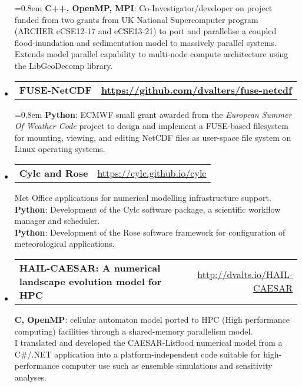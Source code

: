 \documentclass[10.5pt,a4]{article}
\makeatletter
\newcommand{\headerrow}[2]
{\begin{tabular*}{\linewidth}{l@{\extracolsep{\fill}}r}
	#1 &
	#2 \\
\end{tabular*}}
\newcommand{\CPP}
{C\nolinebreak[4]\hspace{-.05em}\raisebox{.22ex}{\footnotesize\bf ++}}
\makeatother
\begin{document}
\begin{itemize}
		\parskip=0.8em
		\textbf{C++, OpenMP, MPI}: Co-Investigator/developer on project funded from two grants from UK National Supercomputer program (ARCHER eCSE12-17 and eCSE13-21) to port and parallelise a coupled flood-inundation and sedimentation model to massively parallel systems. Extends model parallel capability to multi-node compute architecture using the LibGeoDecomp library. 

\item
\headerrow
		{\textbf{FUSE-NetCDF}}
		{\textbf{\url{https://github.com/dvalters/fuse-netcdf}}}

		\parskip=0.8em
		\textbf{Python}: ECMWF small grant awarded from the \textit{European Summer Of Weather Code} project to design and implement a FUSE-based filesystem for mounting, viewing, and editing NetCDF files as user-space file system on Linux operating systems.

%

	\item
	\headerrow
		{\textbf{Cylc and Rose}}
		{\url{https://cylc.github.io/cylc}}

		Met Office applications for numerical modelling infrastructure support. \\
		\textbf{Python}: Development of the Cylc software package, a scientific workflow manager and scheduler. \\ 
		\textbf{Python}: Development of the Rose software framework for configuration of meteorological applications. 

	\item
	\headerrow
		{\textbf{HAIL-CAESAR: A numerical landscape evolution model for HPC}}
		{\url{http://dvalts.io/HAIL-CAESAR}}

		\textbf{{\CPP}, OpenMP}: cellular automaton model ported to HPC (High performance computing) facilities through a shared-memory parallelism model. \\
		I translated and developed the CAESAR-Lisflood numerical model from a C{\#}/.NET application into a platform-independent code suitable for high-performance computer use such as ensemble simulations and sensitivity analyses. 



\end{itemize}
\end{document}
